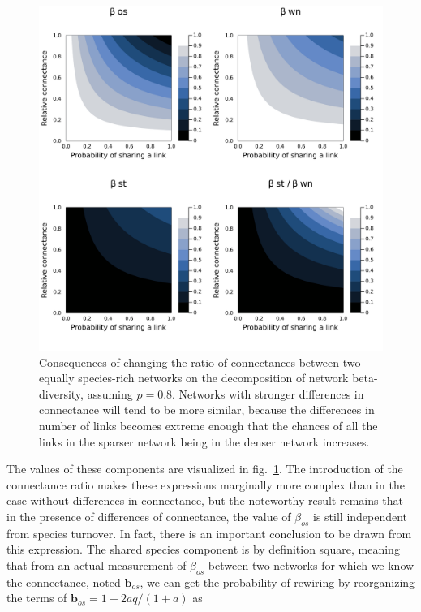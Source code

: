 \documentclass[11pt]{article}
\makeatletter
\def\maxwidth{\ifdim\Gin@nat@width>\linewidth\linewidth
\else\Gin@nat@width\fi}
\let\Oldincludegraphics\includegraphics
\renewcommand{\includegraphics}[1]{\Oldincludegraphics[width=\maxwidth]{#1}}
\makeatother
\begin{document}
\begin{figure}
\hypertarget{fig:connectance}{%
\centering
\includegraphics{figures/connectance/components.png}
\caption{Consequences of changing the ratio of connectances between two
equally species-rich networks on the decomposition of network
beta-diversity, assuming \(p = 0.8\). Networks with stronger differences
in connectance will tend to be more similar, because the differences in
number of links becomes extreme enough that the chances of all the links
in the sparser network being in the denser network
increases.}\label{fig:connectance}
}
\end{figure}

The values of these components are visualized in
fig.~\ref{fig:connectance}. The introduction of the connectance ratio
makes these expressions marginally more complex than in the case without
differences in connectance, but the noteworthy result remains that in
the presence of differences of connectance, the value of \(\beta_{os}\)
is still independent from species turnover. In fact, there is an
important conclusion to be drawn from this expression. The shared
species component is by definition square, meaning that from an actual
measurement of \(\beta_{os}\) between two networks for which we know the
connectance, noted \(\mathbf{b}_{os}\), we can get the probability of
rewiring by reorganizing the terms of
\(\mathbf{b}_{os} = 1 - 2aq/(1+a)\) as
\end{document}
